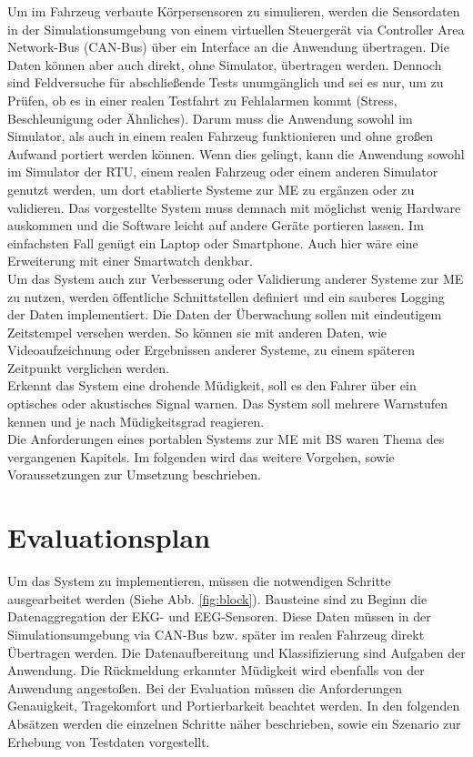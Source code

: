{Um im Fahrzeug verbaute Körpersensoren zu simulieren, werden die Sensordaten in der Simulationsumgebung von einem virtuellen Steuergerät via Controller Area Network-Bus (CAN-Bus) über ein Interface an die Anwendung übertragen. Die Daten können aber auch direkt, ohne Simulator, übertragen werden. 
Dennoch sind Feldversuche für abschließende Tests unumgänglich und sei es nur, um zu Prüfen, ob es in einer realen Testfahrt zu Fehlalarmen kommt (Stress, Beschleunigung oder Ähnliches). Darum muss die Anwendung sowohl im Simulator, als auch in einem realen Fahrzeug funktionieren und ohne großen Aufwand portiert werden können. Wenn dies gelingt, kann die Anwendung sowohl im Simulator der \acl{RTU}, einem realen Fahrzeug oder einem anderen Simulator genutzt werden, um dort etablierte Systeme zur \acl{ME} zu ergänzen oder zu validieren.
Das vorgestellte System muss demnach mit möglichst wenig Hardware auskommen und die Software leicht auf andere Geräte portieren lassen. Im einfachsten Fall genügt ein Laptop oder Smartphone. Auch hier wäre eine Erweiterung mit  einer Smartwatch denkbar.\\

Um das System auch zur Verbesserung oder Validierung anderer Systeme zur \acl{ME} zu nutzen, werden öffentliche Schnittstellen definiert und ein sauberes Logging der Daten implementiert. Die Daten der Überwachung sollen mit eindeutigem Zeitstempel versehen werden. So können sie mit anderen Daten, wie Videoaufzeichnung oder Ergebnissen anderer Systeme, zu einem späteren Zeitpunkt verglichen werden. \\

Erkennt das System eine drohende Müdigkeit, soll es den Fahrer über ein optisches oder akustisches Signal warnen. Das System soll mehrere Warnstufen kennen und je nach Müdigkeitsgrad reagieren. \\

Die Anforderungen eines portablen Systems zur \acl{ME} mit \acl{BS} waren Thema des vergangenen Kapitels. Im folgenden wird das weitere Vorgehen, sowie Voraussetzungen zur Umsetzung beschrieben.

\section{Evaluationsplan}
\label{chap:eval}
Um das System zu implementieren, müssen die notwendigen Schritte ausgearbeitet werden (Siehe Abb. \ref{fig:block}). Bausteine sind zu Beginn die Datenaggregation der EKG- und EEG-Sensoren. Diese Daten müssen in der Simulationsumgebung via CAN-Bus bzw. später im realen Fahrzeug direkt Übertragen werden. Die Datenaufbereitung und Klassifizierung sind Aufgaben der Anwendung. Die Rückmeldung erkannter Müdigkeit wird ebenfalls von der Anwendung angestoßen. 
Bei der Evaluation müssen die Anforderungen Genauigkeit, Tragekomfort und Portierbarkeit beachtet werden. In den folgenden Absätzen werden die einzelnen Schritte näher beschrieben, sowie ein Szenario zur Erhebung von Testdaten vorgestellt.

}
